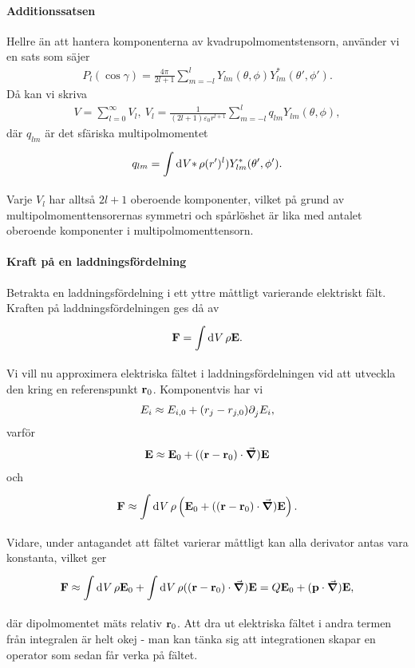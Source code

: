 \paragraph{Additionssatsen}
Hellre än att hantera komponenterna av kvadrupolmomentstensorn, använder vi en sats som säjer
\begin{align*}
	P_{l}(\cos{\gamma}) = \frac{4\pi}{2l + 1}\sum\limits_{m = -l}^{l}Y_{lm}(\theta, \phi)Y_{lm}^{*}(\theta', \phi').
\end{align*}
Då kan vi skriva
\begin{align*}
	V = \sum\limits_{l = 0}^{\infty}V_{l},\ V_{l} = \frac{1}{(2l + 1)\varepsilon_{0}r^{l + 1}}\sum\limits_{m = -l}^{l}q_{lm}Y_{lm}(\theta, \phi),
\end{align*}
där $q_{lm}$ är det sfäriska multipolmomentet
\begin{align*}
	q_{lm} = \int\limits_{}^{}\dd[]{V*}\rho (r')^{l})Y_{lm}^{*}(\theta', \phi').
\end{align*}
Varje $V_{l}$ har alltså $2l + 1$ oberoende komponenter, vilket på grund av multipolmomenttensorernas symmetri och spårlöshet är lika med antalet oberoende komponenter i multipolmomenttensorn.

\paragraph{Kraft på en laddningsfördelning}
Betrakta en laddningsfördelning i ett yttre måttligt varierande elektriskt fält. Kraften på laddningsfördelningen ges då av
\begin{align*}
	\vb{F} = \int\limits_{}^{}\dd[]{V}\rho\vb{E}.
\end{align*}
Vi vill nu approximera elektriska fältet i laddningsfördelningen vid att utveckla den kring en referenspunkt $\vb{r}_{0}$. Komponentvis har vi
\begin{align*}
	E_{i} \approx E_{i, 0} + (r_{j} - r_{j, 0})\partial_{j}^{}E_{i},
\end{align*}
varför
\begin{align*}
	\vb{E} \approx \vb{E}_{0} + ((\vb{r} - \vb{r}_{0})\cdot\grad)\vb{E}
\end{align*}
och
\begin{align*}
	\vb{F} \approx \int\limits_{}^{}\dd[]{V}\rho\left(\vb{E}_{0} + ((\vb{r} - \vb{r}_{0})\cdot\grad)\vb{E}\right).
\end{align*}
Vidare, under antagandet att fältet varierar måttligt kan alla derivator antas vara konstanta, vilket ger
\begin{align*}
	\vb{F} \approx \int\limits_{}^{}\dd[]{V}\rho\vb{E}_{0} + \int\limits_{}^{}\dd[]{V}\rho((\vb{r} - \vb{r}_{0})\cdot\grad)\vb{E} = Q\vb{E}_{0} + (\vb{p}\cdot\grad)\vb{E},
\end{align*}
där dipolmomentet mäts relativ $\vb{r}_{0}$. Att dra ut elektriska fältet i andra termen från integralen är helt okej - man kan tänka sig att integrationen skapar en operator som sedan får verka på fältet.

